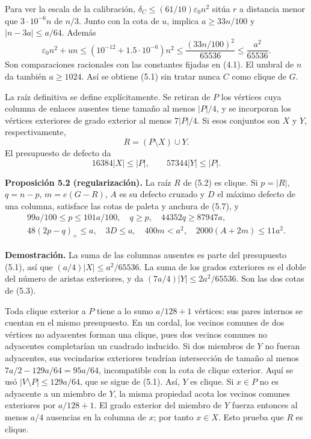 \documentclass[spanish,11pt,a4paper]{article}
\begin{document}
Para ver la escala de la calibración, \(\delta_C\le(61/10)\varepsilon_0n^2\) sitúa \(r\) a distancia menor que \(3\cdot10^{-6}n\) de \(n/3\). Junto con la cota de \(u\), implica \(a\ge33n/100\) y \(|n-3a|\le a/64\). Además \[
\varepsilon_0n^2+un\le(10^{-12}+1.5\cdot10^{-6})n^2
\le\frac{(33n/100)^2}{65536}\le\frac{a^2}{65536}.
\] Son comparaciones racionales con las constantes fijadas en (4.1). El umbral de \(n\) da también \(a\ge1024\). Así se obtiene (5.1) sin tratar nunca \(C\) como clique de \(G\).

La raíz definitiva se define explícitamente. Se retiran de \(P\) los vértices cuya columna de enlaces ausentes tiene tamaño al menos \(|P|/4\), y se incorporan los vértices exteriores de grado exterior al menos \(7|P|/4\). Si esos conjuntos son \(X\) y \(Y\), respectivamente, \[
R=(P\setminus X)\cup Y.
\tag{5.2}
\] El presupuesto de defecto da \[
16384|X|\le |P|,\qquad 57344|Y|\le |P|.
\tag{5.3}
\] 

\textbf{Proposición 5.2 (regularización).} La raíz \(R\) de (5.2) es clique. Si \(p=|R|\), \(q=n-p\), \(m=e(G-R)\), \(A\) es su defecto cruzado y \(D\) el máximo defecto de una columna, satisface las cotas de paleta y anchura de (5.7), y \[
\begin{gathered}
99a/100\le p\le101a/100,\quad q\ge p,\quad
44352q\ge87947a,\\
48(2p-q)_+\le a,\quad 3D\le a,\quad
400m<a^2,\quad2000(A+2m)\le11a^2.
\end{gathered}
\tag{5.4}
\]

\textbf{Demostración.} La suma de las columnas ausentes es parte del presupuesto (5.1), así que \((a/4)|X|\le a^2/65536\). La suma de los grados exteriores es el doble del número de aristas exteriores, y da \((7a/4)|Y|\le2a^2/65536\). Son las dos cotas de (5.3).

Toda clique exterior a \(P\) tiene a lo sumo \(a/128+1\) vértices: sus pares internos se cuentan en el mismo presupuesto. En un cordal, los vecinos comunes de dos vértices no adyacentes forman una clique, pues dos vecinos comunes no adyacentes completarían un cuadrado inducido. Si dos miembros de \(Y\) no fueran adyacentes, sus vecindarios exteriores tendrían intersección de tamaño al menos \(7a/2-129a/64=95a/64\), incompatible con la cota de clique exterior. Aquí se usó \(|V\setminus P|\le129a/64\), que se sigue de (5.1). Así, \(Y\) es clique. Si \(x\in P\) no es adyacente a un miembro de \(Y\), la misma propiedad acota los vecinos comunes exteriores por \(a/128+1\). El grado exterior del miembro de \(Y\) fuerza entonces al menos \(a/4\) ausencias en la columna de \(x\); por tanto \(x\in X\). Esto prueba que \(R\) es clique.
\end{document}
